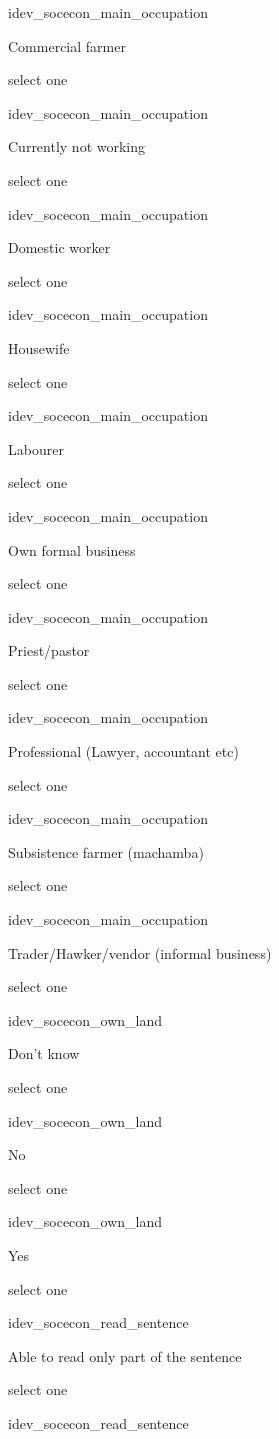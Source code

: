 \documentclass[]{article}
\begin{document}
idev\_socecon\_main\_occupation

Commercial farmer

select one

idev\_socecon\_main\_occupation

Currently not working

select one

idev\_socecon\_main\_occupation

Domestic worker

select one

idev\_socecon\_main\_occupation

Housewife

select one

idev\_socecon\_main\_occupation

Labourer

select one

idev\_socecon\_main\_occupation

Own formal business

select one

idev\_socecon\_main\_occupation

Priest/pastor

select one

idev\_socecon\_main\_occupation

Professional (Lawyer, accountant etc)

select one

idev\_socecon\_main\_occupation

Subsistence farmer (machamba)

select one

idev\_socecon\_main\_occupation

Trader/Hawker/vendor (informal business)

select one

idev\_socecon\_own\_land

Don't know

select one

idev\_socecon\_own\_land

No

select one

idev\_socecon\_own\_land

Yes

select one

idev\_socecon\_read\_sentence

Able to read only part of the sentence

select one

idev\_socecon\_read\_sentence
\end{document}
